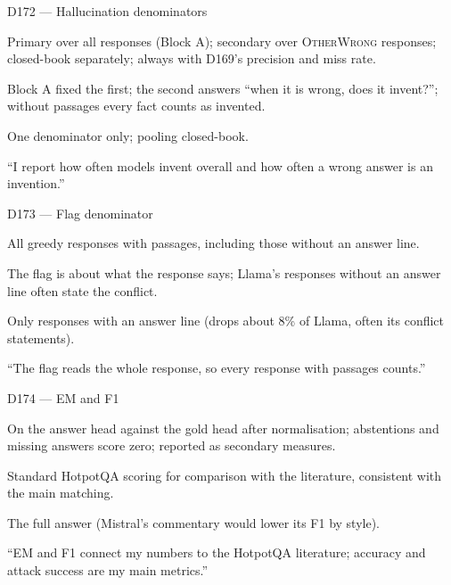 \documentclass[11pt,a4paper]{report}
\begin{document}
\begin{decisionbox}{D172 --- Hallucination denominators}
\begin{description}[nosep, leftmargin=0pt]
  \item[Decision.] Primary over all responses (Block A); secondary over \textsc{OtherWrong} responses; closed-book separately; always with D169's precision and miss rate.
  \item[Why.] Block A fixed the first; the second answers ``when it is wrong, does it invent?''; without passages every fact counts as invented.
  \item[Alternatives.] One denominator only; pooling closed-book.
  \item[Interview line.] ``I report how often models invent overall and how often a wrong answer is an invention.''
\end{description}
\end{decisionbox}

\begin{decisionbox}{D173 --- Flag denominator}
\begin{description}[nosep, leftmargin=0pt]
  \item[Decision.] All greedy responses with passages, including those without an answer line.
  \item[Why.] The flag is about what the response says; Llama's responses without an answer line often state the conflict.
  \item[Alternatives.] Only responses with an answer line (drops about 8\% of Llama, often its conflict statements).
  \item[Interview line.] ``The flag reads the whole response, so every response with passages counts.''
\end{description}
\end{decisionbox}

\begin{decisionbox}{D174 --- EM and F1}
\begin{description}[nosep, leftmargin=0pt]
  \item[Decision.] On the answer head against the gold head after normalisation; abstentions and missing answers score zero; reported as secondary measures.
  \item[Why.] Standard HotpotQA scoring for comparison with the literature, consistent with the main matching.
  \item[Alternatives.] The full answer (Mistral's commentary would lower its F1 by style).
  \item[Interview line.] ``EM and F1 connect my numbers to the HotpotQA literature; accuracy and attack success are my main metrics.''
\end{description}
\end{decisionbox}
\end{document}
